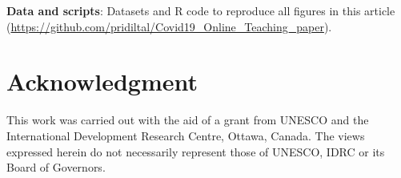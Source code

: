 \documentclass[11pt,a4paper,]{article}
\begin{document}
\textbf{Data and scripts}: Datasets and R code to reproduce all figures in this article (\url{https://github.com/pridiltal/Covid19_Online_Teaching_paper}).

\hypertarget{acknowledgment}{%
\section*{Acknowledgment}\label{acknowledgment}}

This work was carried out with the aid of a grant from UNESCO and the International Development Research Centre, Ottawa, Canada. The views expressed herein do not necessarily represent those of UNESCO, IDRC or its Board of Governors.

\printbibliography
\end{document}
